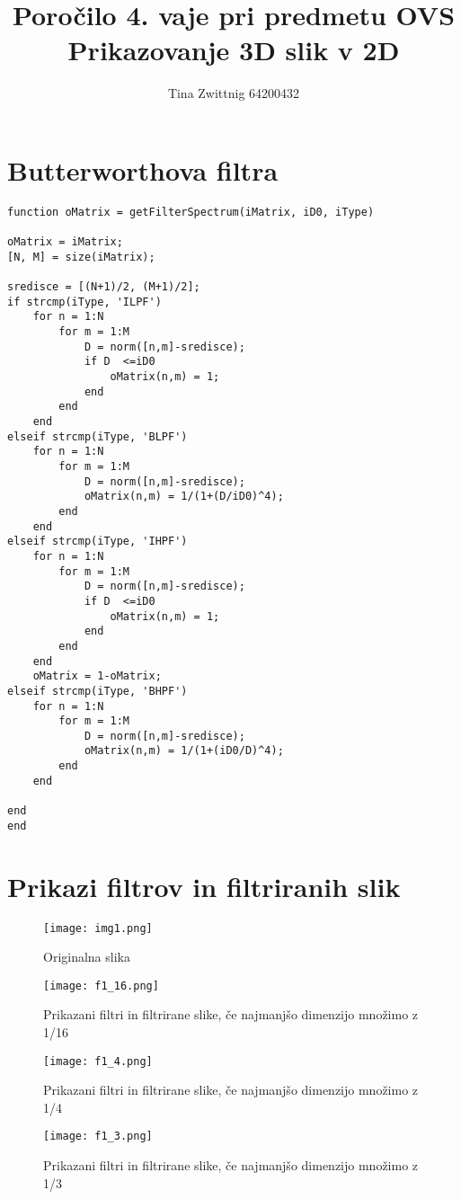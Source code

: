 \documentclass[12pt,a4paper]{article}
\author{Tina Zwittnig 64200432}
\title{Poročilo 4. vaje pri predmetu OVS \\ Prikazovanje 3D slik v 2D}
\begin{document}
\maketitle
\pagebreak
\section{Butterworthova filtra}
\begin{verbatim}
function oMatrix = getFilterSpectrum(iMatrix, iD0, iType)

oMatrix = iMatrix;
[N, M] = size(iMatrix);

sredisce = [(N+1)/2, (M+1)/2];
if strcmp(iType, 'ILPF')
    for n = 1:N
        for m = 1:M
            D = norm([n,m]-sredisce);
            if D  <=iD0
                oMatrix(n,m) = 1;
            end
        end
    end
elseif strcmp(iType, 'BLPF')
    for n = 1:N
        for m = 1:M
            D = norm([n,m]-sredisce);
            oMatrix(n,m) = 1/(1+(D/iD0)^4);
        end
    end               
elseif strcmp(iType, 'IHPF')
    for n = 1:N
        for m = 1:M
            D = norm([n,m]-sredisce);
            if D  <=iD0
                oMatrix(n,m) = 1;
            end
        end
    end
    oMatrix = 1-oMatrix;
elseif strcmp(iType, 'BHPF')
    for n = 1:N
        for m = 1:M
            D = norm([n,m]-sredisce);
            oMatrix(n,m) = 1/(1+(iD0/D)^4);
        end
    end   
    
end
end
\end{verbatim}
\pagebreak
\section{Prikazi filtrov in filtriranih slik}
\begin{figure}[h!]
  \begin{center}
    \texttt{[image: img1.png]}
    \caption{Originalna slika}
    \label{fig:}
  \end{center}
\end{figure}
\begin{figure}[h!]
  \begin{center}
    \texttt{[image: f1\_16.png]}
    \caption{Prikazani filtri in filtrirane slike, če najmanjšo dimenzijo množimo z 1/16}
    \label{fig:}
  \end{center}
\end{figure}
\pagebreak
\begin{figure}[h!]
  \begin{center}
    \texttt{[image: f1\_4.png]}
    \caption{Prikazani filtri in filtrirane slike, če najmanjšo dimenzijo množimo z 1/4}
    \label{fig:}
  \end{center}
\end{figure}
\begin{figure}[h!]
  \begin{center}
    \texttt{[image: f1\_3.png]}
    \caption{Prikazani filtri in filtrirane slike, če najmanjšo dimenzijo množimo z 1/3}
    \label{fig:}
  \end{center}
\end{figure}
\end{document}
